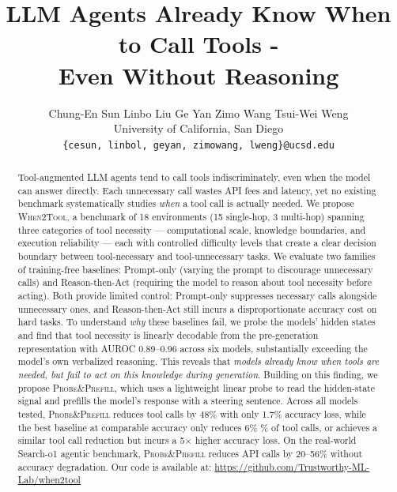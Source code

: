 \documentclass{article}
\title{LLM Agents Already Know When to Call Tools - \\ Even Without Reasoning}
\author{%
  Chung-En Sun \quad
  Linbo Liu \quad
  Ge Yan \quad
  Zimo Wang \quad
  Tsui-Wei Weng \\
  University of California, San Diego \\
  \texttt{\{cesun, linbol, geyan, zimowang, lweng\}@ucsd.edu}
}
\newcommand{\method}{\textsc{Probe\&Prefill}}
\newcommand{\benchmark}{\textsc{When2Tool}}
\begin{document}
\maketitle

\doparttoc
\faketableofcontents

\begin{abstract}
Tool-augmented LLM agents tend to call tools indiscriminately, even when the model can answer directly. Each unnecessary call wastes API fees and latency, yet no existing benchmark systematically studies \emph{when} a tool call is actually needed. We propose \benchmark{}, a benchmark of 18 environments (15 single-hop, 3 multi-hop) spanning three categories of tool necessity --- computational scale, knowledge boundaries, and execution reliability --- each with controlled difficulty levels that create a clear decision boundary between tool-necessary and tool-unnecessary tasks. We evaluate two families of training-free baselines: Prompt-only (varying the prompt to discourage unnecessary calls) and Reason-then-Act (requiring the model to reason about tool necessity before acting). Both provide limited control: Prompt-only suppresses necessary calls alongside unnecessary ones, and Reason-then-Act still incurs a disproportionate accuracy cost on hard tasks. To understand \emph{why} these baselines fail, we probe the models' hidden states and find that tool necessity is linearly decodable from the pre-generation representation with AUROC 0.89--0.96 across six models, substantially exceeding the model's own verbalized reasoning. This reveals that \textit{models already know when tools are needed, but fail to act on this knowledge during generation}. Building on this finding, we propose \method{}, which uses a lightweight linear probe to read the hidden-state signal and prefills the model's response with a steering sentence. Across all models tested, \method{} reduces tool calls by 48\% with only 1.7\% accuracy loss, while the best baseline at comparable accuracy only reduces 6\% \% of tool calls, or achieves a similar tool call reduction but incurs a 5$\times$ higher accuracy loss. On the real-world Search-o1 agentic benchmark, \method{} reduces API calls by 20--56\% without accuracy degradation. Our code is available at: \textsf{{\small \href{https://github.com/Trustworthy-ML-Lab/when2tool}{https://github.com/Trustworthy-ML-Lab/when2tool}}}
\end{abstract}








\end{document}
